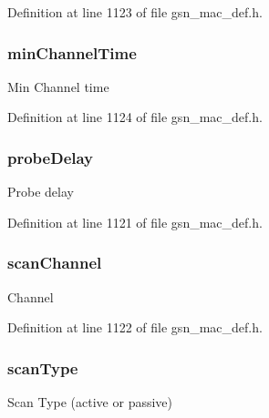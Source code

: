 Definition at line 1123 of file gsn\_\-mac\_\-def.h.

\hypertarget{a00130_a73104a45d2e7df35ab2fa7cb1058d46e}{
\subsubsection[{minChannelTime}]{ {\bf minChannelTime}}}
\label{a00130_a73104a45d2e7df35ab2fa7cb1058d46e}
Min Channel time 

Definition at line 1124 of file gsn\_\-mac\_\-def.h.

\hypertarget{a00130_a65f7529d80c77db8f777b2f544345db7}{
\subsubsection[{probeDelay}]{ {\bf probeDelay}}}
\label{a00130_a65f7529d80c77db8f777b2f544345db7}
Probe delay 

Definition at line 1121 of file gsn\_\-mac\_\-def.h.

\hypertarget{a00130_a17f8f4dca152d72705ca878cf313aa41}{
\subsubsection[{scanChannel}]{ {\bf scanChannel}}}
\label{a00130_a17f8f4dca152d72705ca878cf313aa41}
Channel 

Definition at line 1122 of file gsn\_\-mac\_\-def.h.

\hypertarget{a00130_a000a5568cb4c2c12ad873696b2d6f83e}{
\subsubsection[{scanType}]{ {\bf scanType}}}
\label{a00130_a000a5568cb4c2c12ad873696b2d6f83e}
Scan Type (active or passive) 

